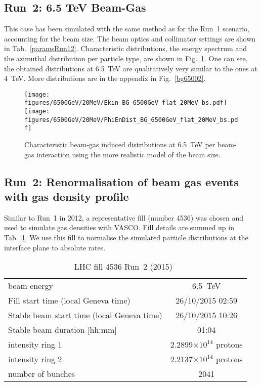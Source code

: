 \subsection{Run~2: 6.5 TeV Beam-Gas}

This case has been simulated with the same method as for the Run~1 scenario, accounting for the beam size. The beam optics and collimator settings are shown in Tab.~\ref{paramsRun12}. Characteristic distributions, the energy spectrum and the azimuthal distribution per particle type, are shown in Fig.~\ref{bg6500}. One can see, the obtained distributions at 6.5~TeV are qualitatively very similar to the ones at 4~TeV. More distributions are in the appendix in Fig.~\ref{bg65002}. 

\begin{figure}%
\begin{center}
  \texttt{[image: figures/6500GeV/20MeV/Ekin\_BG\_6500GeV\_flat\_20MeV\_bs.pdf]}
  \texttt{[image: figures/6500GeV/20MeV/PhiEnDist\_BG\_6500GeV\_flat\_20MeV\_bs.pdf]}
\end{center}
\vspace{-0.6cm}
 \caption{Characteristic beam-gas induced distributions at 6.5~TeV per beam-gas interaction using the more realistic model of the beam size.
  \label{bg6500}}
\end{figure}

\subsection{Run~2: Renormalisation of beam gas events with gas density profile}

Similar to Run~1 in 2012, a representative fill (number 4536) was chosen and used to simulate gas densities with VASCO. Fill details are summed up in Tab.~\ref{tab:fillRunII}. We use this fill to normalise the simulated particle distributions at the interface plane to absolute rates. 

\begin{table}
   \centering
   \caption{LHC fill 4536 Run~2 (2015)~\cite{refAccStats}}
   \begin{tabular}{l||c}
       \hline
       beam energy  & 6.5~TeV \\
       Fill start time (local Geneva time) & 26/10/2015 02:59\\
       Stable beam start time (local Geneva time) & 26/10/2015 10:26\\
       Stable beam duration [hh:mm] & 01:04\\
       intensity ring 1& 2.2899$\times 10^{14}$ protons\\
       intensity ring 2& 2.2137$\times 10^{14}$ protons\\
       number of bunches & 2041 \\
       \hline
   \end{tabular}
   \label{tab:fillRunII}
\end{table}

